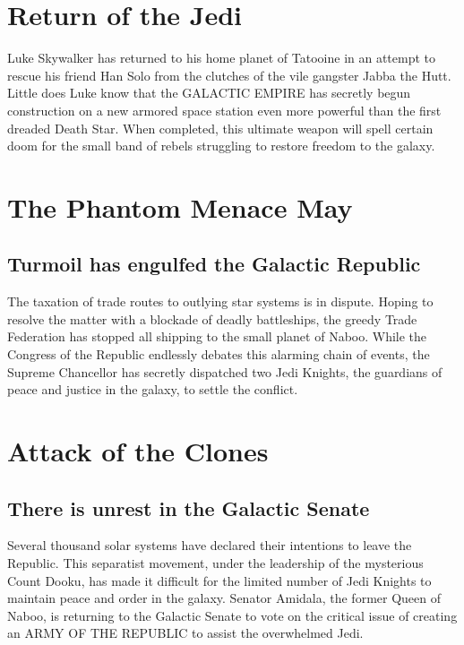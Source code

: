 \documentclass[oneside]{ifgw}
\begin{document}
\lipsum[1-10]



\chapter{Return of the Jedi}
Luke Skywalker has returned to his home planet of Tatooine in an attempt to rescue his friend Han Solo from the clutches of the vile gangster Jabba the Hutt.  Little does Luke know that the GALACTIC EMPIRE has secretly begun construction on a new armored space station even more powerful than the first dreaded Death Star.  When completed, this ultimate weapon will spell certain doom for the small band of rebels struggling to restore freedom to the galaxy.

\lipsum[1-10]



\chapter{The Phantom Menace	May}
\section{Turmoil has engulfed the Galactic Republic}
The taxation of trade routes to outlying star systems is in dispute. Hoping to resolve the matter with a blockade of deadly battleships, the greedy Trade Federation has stopped all shipping to the small planet of Naboo. While the Congress of the Republic endlessly debates this alarming chain of events, the Supreme Chancellor has secretly dispatched two Jedi Knights, the guardians of peace and justice in the galaxy, to settle the conflict.

\lipsum[1-10]



\chapter{Attack of the Clones}	
\section{There is unrest in the Galactic Senate}
Several thousand solar systems have declared their intentions to leave the Republic. This separatist movement, under the leadership of the mysterious Count Dooku, has made it difficult for the limited number of Jedi Knights to maintain peace and order in the galaxy. Senator Amidala, the former Queen of Naboo, is returning to the Galactic Senate to vote on the critical issue of creating an ARMY OF THE REPUBLIC to assist the overwhelmed Jedi.
\end{document}
